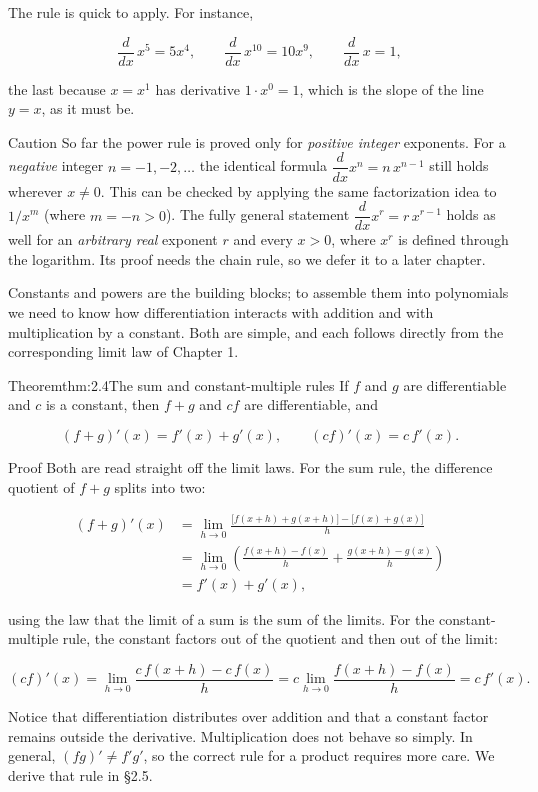 \documentclass[a4paper,12pt,oneside]{memoir}
\begin{document}
The rule is quick to apply. For instance,

\[ \frac{d}{dx}\,x^{5} = 5x^{4}, \qquad \frac{d}{dx}\,x^{10} = 10x^{9}, \qquad \frac{d}{dx}\,x = 1, \]

the last because \(x = x^{1}\) has derivative \(1 \cdot x^{0} = 1\), which is the slope of the line \(y = x\), as it must be.

\begin{envcaution}{Caution}{}{}
So far the power rule is proved only for \emph{positive integer} exponents. For a \emph{negative} integer \(n = -1, -2, \ldots\) the identical formula \(\dfrac{d}{dx}x^{n} = n\,x^{n-1}\) still holds wherever \(x \ne 0\). This can be checked by applying the same factorization idea to \(1/x^{m}\) (where \(m = -n > 0\)). The fully general statement \(\dfrac{d}{dx}x^{r} = r\,x^{r-1}\) holds as well for an \emph{arbitrary real} exponent \(r\) and every \(x > 0\), where \(x^{r}\) is defined through the logarithm. Its proof needs the chain rule, so we defer it to a later chapter.
\end{envcaution}
Constants and powers are the building blocks; to assemble them into polynomials we need to know how differentiation interacts with addition and with multiplication by a constant. Both are simple, and each follows directly from the corresponding limit law of Chapter 1.

\begin{envtheorem}{Theorem}{thm:2.4}{The sum and constant-multiple rules}
If \(f\) and \(g\) are differentiable and \(c\) is a constant, then \(f + g\) and \(cf\) are differentiable, and

\[ (f + g)'(x) = f'(x) + g'(x), \qquad (cf)'(x) = c\,f'(x). \]
\end{envtheorem}
\begin{envproof}{Proof}{}{}
Both are read straight off the limit laws. For the sum rule, the difference quotient of \(f + g\) splits into two:

\[ \begin{aligned}
        (f + g)'(x) &= \lim_{h \to 0} \frac{\bigl[f(x+h) + g(x+h)\bigr] - \bigl[f(x) + g(x)\bigr]}{h} \\[2pt]
        &= \lim_{h \to 0} \left( \frac{f(x+h) - f(x)}{h} + \frac{g(x+h) - g(x)}{h} \right) \\[2pt]
        &= f'(x) + g'(x),
      \end{aligned} \]

using the law that the limit of a sum is the sum of the limits. For the constant-multiple rule, the constant factors out of the quotient and then out of the limit:

\[ (cf)'(x) = \lim_{h \to 0} \frac{c\,f(x+h) - c\,f(x)}{h} = c \lim_{h \to 0} \frac{f(x+h) - f(x)}{h} = c\,f'(x). \]
\end{envproof}
Notice that differentiation distributes over addition and that a constant factor remains outside the derivative. Multiplication does not behave so simply. In general, \((fg)' \ne f'g'\), so the correct rule for a product requires more care. We derive that rule in §2.5.
\end{document}
